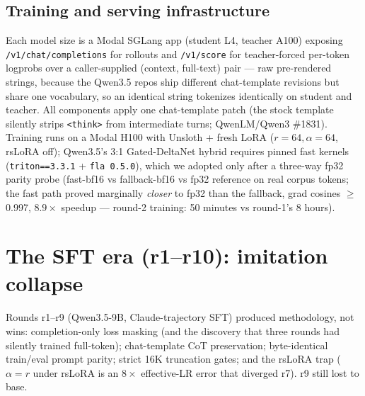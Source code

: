 \documentclass[11pt]{article}
\begin{document}
\subsection{Training and serving infrastructure}
Each model size is a Modal SGLang app (student L4, teacher A100) exposing
\texttt{/v1/chat/completions} for rollouts and \texttt{/v1/score} for teacher-forced per-token
logprobs over a caller-supplied (context, full-text) pair --- raw pre-rendered strings, because
the Qwen3.5 repos ship different chat-template revisions but share one vocabulary, so an identical
string tokenizes identically on student and teacher. All components apply one chat-template patch
(the stock template silently strips \texttt{<think>} from intermediate turns; QwenLM/Qwen3
\#1831). Training runs on a Modal H100 with Unsloth + fresh LoRA ($r{=}64,\alpha{=}64$,
rsLoRA off); Qwen3.5's 3:1 Gated-DeltaNet hybrid requires pinned fast kernels
(\texttt{triton==3.3.1} + \texttt{fla 0.5.0}), which we adopted only after a three-way fp32
parity probe (fast-bf16 vs fallback-bf16 vs fp32 reference on real corpus tokens; the fast path
proved marginally \emph{closer} to fp32 than the fallback, grad cosines $\ge$0.997, $8.9\times$
speedup --- round-2 training: 50 minutes vs round-1's 8 hours).

\section{The SFT era (r1--r10): imitation collapse}

Rounds r1--r9 (Qwen3.5-9B, Claude-trajectory SFT) produced methodology, not wins: completion-only
loss masking (and the discovery that three rounds had silently trained full-token);
chat-template CoT preservation; byte-identical train/eval prompt parity; strict 16K truncation
gates; and the rsLoRA trap ($\alpha{=}r$ under rsLoRA is an $8\times$ effective-LR error that
diverged r7). r9 still lost to base.
\end{document}
